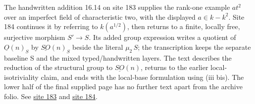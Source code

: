 The handwritten addition 16.14 on site 183 supplies the rank-one example \(at^2\) over an imperfect field of characteristic two, with the displayed \(a\in k-k^2\). Site 184 continues it by referring to \(k(a^{1/2})\), then returns to a finite, locally free, surjective morphism \(S'\longrightarrow S\). Its added group expression writes a quotient of \(\underline O(n)_S\) by \(\underline{SO}(n)_S\) beside the literal \(\mu_2\,S\); the transcription keeps the separate baseline S and the mixed typed/handwritten layers. The text describes the reduction of the structural group to \(\underline{SO}(n)\), returns to the earlier local-isotriviality claim, and ends with the local-base formulation using (iii bis). The lower half of the final supplied page has no further text apart from the archive folio. See \href{https://grothendieck.umontpellier.fr/web/viewer.html?file=../25.pdf#page=184}{site 183} and \href{https://grothendieck.umontpellier.fr/web/viewer.html?file=../25.pdf#page=185}{site 184}.
